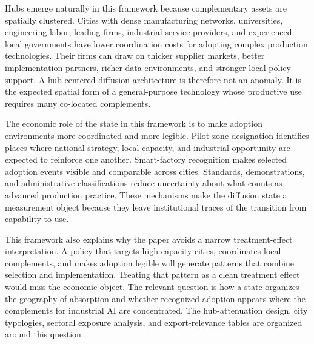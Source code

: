 Hubs emerge naturally in this framework because complementary assets are spatially clustered. Cities with dense manufacturing networks, universities, engineering labor, leading firms, industrial-service providers, and experienced local governments have lower coordination costs for adopting complex production technologies. Their firms can draw on thicker supplier markets, better implementation partners, richer data environments, and stronger local policy support. A hub-centered diffusion architecture is therefore not an anomaly. It is the expected spatial form of a general-purpose technology whose productive use requires many co-located complements.

The economic role of the state in this framework is to make adoption environments more coordinated and more legible. Pilot-zone designation identifies places where national strategy, local capacity, and industrial opportunity are expected to reinforce one another. Smart-factory recognition makes selected adoption events visible and comparable across cities. Standards, demonstrations, and administrative classifications reduce uncertainty about what counts as advanced production practice. These mechanisms make the diffusion state a measurement object because they leave institutional traces of the transition from capability to use.

This framework also explains why the paper avoids a narrow treatment-effect interpretation. A policy that targets high-capacity cities, coordinates local complements, and makes adoption legible will generate patterns that combine selection and implementation. Treating that pattern as a clean treatment effect would miss the economic object. The relevant question is how a state organizes the geography of absorption and whether recognized adoption appears where the complements for industrial AI are concentrated. The hub-attenuation design, city typologies, sectoral exposure analysis, and export-relevance tables are organized around this question.
